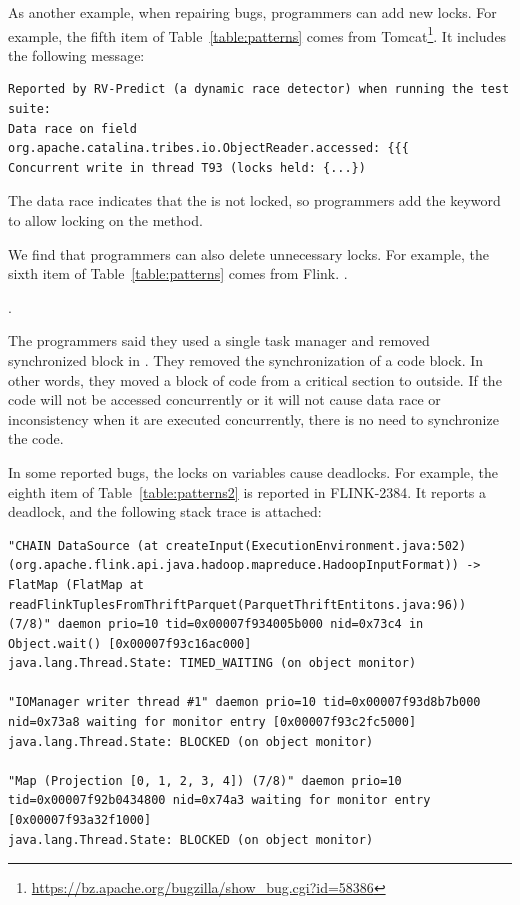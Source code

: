 As another example, when repairing bugs, programmers can add new locks. For example, the fifth item of Table~\ref{table:patterns} comes from Tomcat\footnote{\url{https://bz.apache.org/bugzilla/show\_bug.cgi?id=58386}}. It includes the following message:

\begin{lstlisting}
Reported by RV-Predict (a dynamic race detector) when running the test suite:
Data race on field org.apache.catalina.tribes.io.ObjectReader.accessed: {{{
Concurrent write in thread T93 (locks held: {...})
\end{lstlisting}

The data race indicates that the  is not locked, so programmers add the  keyword to allow locking on the method.

We find that programmers can also delete unnecessary locks. For example, the sixth item of Table~\ref{table:patterns} comes from Flink. .

.

The programmers said they used a single task manager and removed synchronized block in . They removed the synchronization of a code block. In other words, they moved a block of code from a critical section to outside. If the code will not be accessed concurrently or it will not cause data race or inconsistency when it are executed concurrently, there is no need to synchronize the code.

In some reported bugs, the locks on variables cause deadlocks. For example, the eighth item of Table~\ref{table:patterns2} is reported in FLINK-2384. It reports a deadlock, and the following stack trace is attached:

\begin{lstlisting}
"CHAIN DataSource (at createInput(ExecutionEnvironment.java:502) (org.apache.flink.api.java.hadoop.mapreduce.HadoopInputFormat)) -> FlatMap (FlatMap at readFlinkTuplesFromThriftParquet(ParquetThriftEntitons.java:96)) (7/8)" daemon prio=10 tid=0x00007f934005b000 nid=0x73c4 in Object.wait() [0x00007f93c16ac000]
java.lang.Thread.State: TIMED_WAITING (on object monitor)

"IOManager writer thread #1" daemon prio=10 tid=0x00007f93d8b7b000 nid=0x73a8 waiting for monitor entry [0x00007f93c2fc5000]
java.lang.Thread.State: BLOCKED (on object monitor)

"Map (Projection [0, 1, 2, 3, 4]) (7/8)" daemon prio=10 tid=0x00007f92b0434800 nid=0x74a3 waiting for monitor entry [0x00007f93a32f1000]
java.lang.Thread.State: BLOCKED (on object monitor)
\end{lstlisting}


